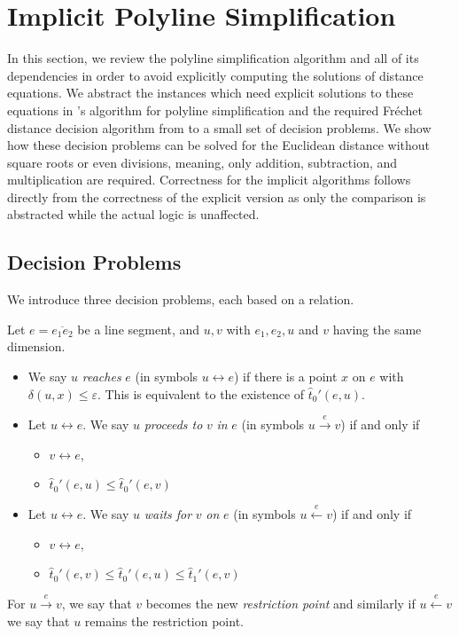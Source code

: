 \section{Implicit Polyline Simplification}\label{sec:implicit_polyline_simplification} 
In this section, we review the polyline simplification algorithm and all of its dependencies in order to avoid explicitly computing the solutions of distance equations. We abstract the instances which need explicit solutions to these equations in \citeauthor{on_optimal_polyline_simplification_using_the_hausdorff_and_frechet_distance}'s algorithm for polyline simplification and the required Fréchet distance decision algorithm from \citeauthor{computing_the_frechet_distance_between_two_polygonal_curves} to a small set of decision problems. 
We show how these decision problems can be solved for the Euclidean distance without square roots or even divisions, meaning, only addition, subtraction, and multiplication are required. Correctness for the implicit algorithms follows directly from the correctness of the explicit version as only the comparison is abstracted while the actual logic is unaffected. 

\subsection{Decision Problems}
We introduce three decision problems, each based on a relation. 
\begin{definition}\label{def:implicit_relations}
  Let \(e = \overline{e_1e_2}\) be a line segment, and \(u, v\) with \(e_1, e_2, u\) and \(v\) having the same dimension. 
  \begin{itemize}
    \item We say \(u\) \emph{reaches} \(e\) (in symbols \(u \leftrightarrow e\)) if there is a point \(x\) on \(e\) with \(\delta(u,x)\leq \varepsilon\). This is equivalent to the existence of \(\hat t_0'(e, u)\).
    \item Let \(u \leftrightarrow e\). We say \(u\) \emph{proceeds to} \(v\) \emph{in} \(e\) (in symbols \(u \overset{e}\rightarrow v\)) if and only if 
      \begin{itemize}
        \item \(v \leftrightarrow e\), 
        \item \(\hat t_0'(e, u) \leq \hat t_0'(e, v)\)
      \end{itemize}

    \item Let \(u \leftrightarrow e\). We say \(u\) \emph{waits for} \(v\) \emph{on} \(e\) (in symbols \(u \overset{e}\leftarrow v\)) if and only if
      \begin{itemize}
        \item \(v \leftrightarrow e\), 
        \item \(\hat t_0'(e, v) \leq \hat t_0'(e, u) \leq \hat t_1'(e, v)\)
      \end{itemize}
  \end{itemize}
  For \(u \overset e\rightarrow v\), we say that \(v\) becomes the new \emph{restriction point} and similarly if \(u \overset e\leftarrow v\) we say that \(u\) remains the restriction point.
\end{definition}

